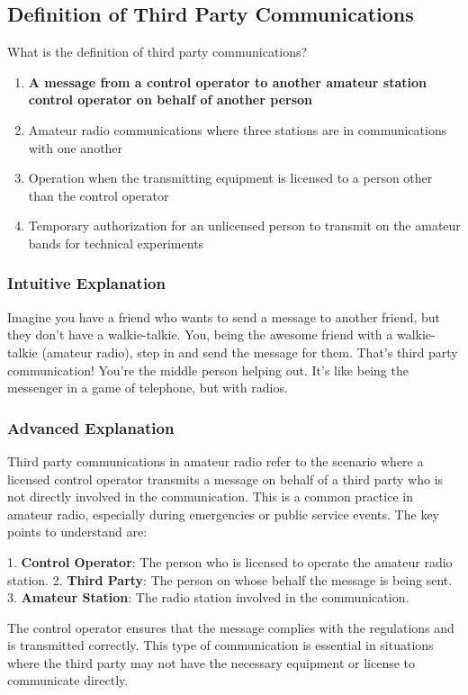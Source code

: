 \subsection{Definition of Third Party Communications}
\label{T1F08}

\begin{tcolorbox}[colback=gray!10!white,colframe=black!75!black,title=T1F08]
What is the definition of third party communications?
\begin{enumerate}[label=\Alph*]
    \item \textbf{A message from a control operator to another amateur station control operator on behalf of another person}
    \item Amateur radio communications where three stations are in communications with one another
    \item Operation when the transmitting equipment is licensed to a person other than the control operator
    \item Temporary authorization for an unlicensed person to transmit on the amateur bands for technical experiments
\end{enumerate}
\end{tcolorbox}

\subsubsection{Intuitive Explanation}
Imagine you have a friend who wants to send a message to another friend, but they don’t have a walkie-talkie. You, being the awesome friend with a walkie-talkie (amateur radio), step in and send the message for them. That’s third party communication! You’re the middle person helping out. It’s like being the messenger in a game of telephone, but with radios.

\subsubsection{Advanced Explanation}
Third party communications in amateur radio refer to the scenario where a licensed control operator transmits a message on behalf of a third party who is not directly involved in the communication. This is a common practice in amateur radio, especially during emergencies or public service events. The key points to understand are:

1. \textbf{Control Operator}: The person who is licensed to operate the amateur radio station.
2. \textbf{Third Party}: The person on whose behalf the message is being sent.
3. \textbf{Amateur Station}: The radio station involved in the communication.

The control operator ensures that the message complies with the regulations and is transmitted correctly. This type of communication is essential in situations where the third party may not have the necessary equipment or license to communicate directly.

